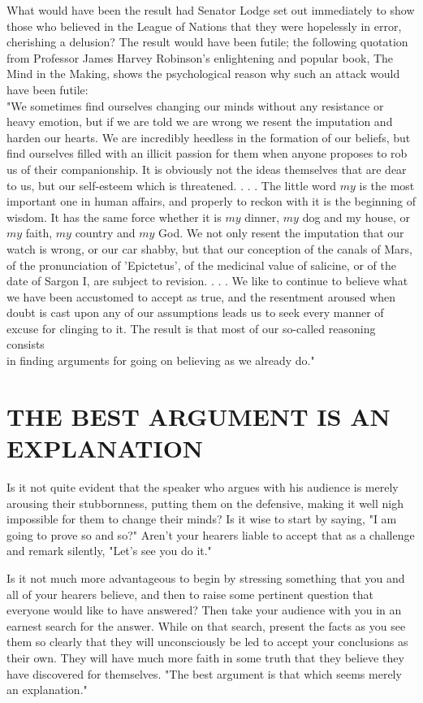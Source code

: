 \documentclass[10pt]{article}
\begin{document}
What would have been the result had Senator Lodge set out immediately to show those who believed in the League of Nations that they were hopelessly in error, cherishing a delusion? The result would have been futile; the following quotation from Professor James Harvey Robinson's enlightening and popular book, The Mind in the Making, shows the psychological reason why such an attack would have been futile:\\
"We sometimes find ourselves changing our minds without any resistance or heavy emotion, but if we are told we are wrong we resent the imputation and harden our hearts. We are incredibly heedless in the formation of our beliefs, but find ourselves filled with an illicit passion for them when anyone proposes to rob us of their companionship. It is obviously not the ideas themselves that are dear to us, but our self-esteem which is threatened. . . . The little word $m y$ is the most important one in human affairs, and properly to reckon with it is the beginning of wisdom. It has the same force whether it is $m y$ dinner, $m y$ dog and my house, or $m y$ faith, $m y$ country and $m y$ God. We not only resent the imputation that our watch is wrong, or our car shabby, but that our conception of the canals of Mars, of the pronunciation of 'Epictetus', of the medicinal value of salicine, or of the date of Sargon I, are subject to revision. . . . We like to continue to believe what we have been accustomed to accept as true, and the resentment aroused when doubt is cast upon any of our assumptions leads us to seek every manner of excuse for clinging to it. The result is that most of our so-called reasoning consists\\
in finding arguments for going on believing as we already do."

\section*{THE BEST ARGUMENT IS AN EXPLANATION}
Is it not quite evident that the speaker who argues with his audience is merely arousing their stubbornness, putting them on the defensive, making it well nigh impossible for them to change their minds? Is it wise to start by saying, "I am going to prove so and so?" Aren't your hearers liable to accept that as a challenge and remark silently, "Let's see you do it."

Is it not much more advantageous to begin by stressing something that you and all of your hearers believe, and then to raise some pertinent question that everyone would like to have answered? Then take your audience with you in an earnest search for the answer. While on that search, present the facts as you see them so clearly that they will unconsciously be led to accept your conclusions as their own. They will have much more faith in some truth that they believe they have discovered for themselves. "The best argument is that which seems merely an explanation."
\end{document}
